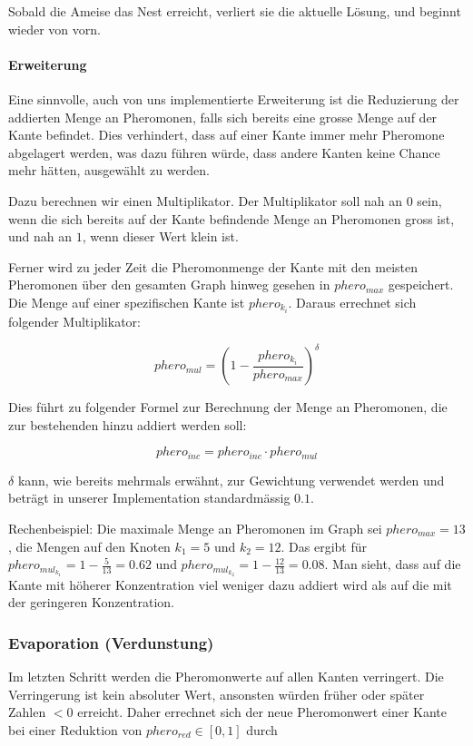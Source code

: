 Sobald die Ameise das Nest erreicht, verliert sie die aktuelle Lösung, und beginnt wieder von vorn.

\paragraph*{Erweiterung}

Eine sinnvolle, auch von uns implementierte Erweiterung ist die Reduzierung der addierten Menge an Pheromonen, falls sich bereits eine grosse Menge auf der Kante befindet. Dies verhindert, dass auf einer Kante immer mehr Pheromone abgelagert werden, was dazu führen würde, dass andere Kanten keine Chance mehr hätten, ausgewählt zu werden.

Dazu berechnen wir einen Multiplikator. Der Multiplikator soll nah an $0$ sein, wenn die sich bereits auf der Kante befindende Menge an Pheromonen gross ist, und nah an $1$, wenn dieser Wert klein ist.

Ferner wird zu jeder Zeit die Pheromonmenge der Kante mit den meisten Pheromonen über den gesamten Graph hinweg gesehen in  $phero_{max}$ gespeichert. Die Menge auf einer spezifischen Kante ist $phero_{k_i}$. Daraus errechnet sich folgender Multiplikator:

\[ phero_{mul} = \left({ 1 - \frac{phero_{k_i}}{phero_{max}}}\right)^\delta \]

\noindent
Dies führt zu folgender Formel zur Berechnung der Menge an Pheromonen, die zur bestehenden hinzu addiert werden soll:

\[ phero_{inc} = phero_{inc} \cdot phero_{mul} \]

\noindent
$\delta$ kann, wie bereits mehrmals erwähnt, zur Gewichtung verwendet werden und beträgt in unserer Implementation standardmässig $0.1$.

Rechenbeispiel: Die maximale Menge an Pheromonen im Graph sei $phero_{max} = 13$, die Mengen auf den Knoten $k_1 = 5$ und $k_2 = 12$. Das ergibt für $phero_{mul_{k_1}} = 1 - \frac{5}{13} = 0.62$ und $phero_{mul_{k_2}} = 1 - \frac{12}{13} = 0.08$. Man sieht, dass auf die Kante mit höherer Konzentration viel weniger dazu addiert wird als auf die mit der geringeren Konzentration.

\subsubsection*{Evaporation (Verdunstung)}

Im letzten Schritt werden die Pheromonwerte auf allen Kanten verringert. Die Verringerung ist kein absoluter Wert, ansonsten würden früher oder später Zahlen $< 0$ erreicht. Daher errechnet sich der neue Pheromonwert einer Kante bei einer Reduktion von $phero_{red} \in [0, 1]$ durch

